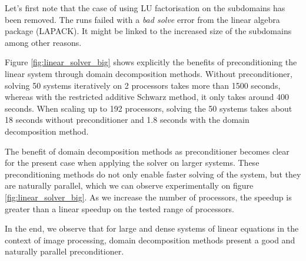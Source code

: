 \ifthesis
 Let's first note that the case of using LU factorisation on the subdomains has been removed.
 The runs failed with a \textit{bad solve} error from the linear algebra package (LAPACK).
 It might be linked to the increased size of the subdomains among other reasons.
\fi

Figure \ref{fig:linear_solver_big} shows explicitly the benefits of preconditioning the linear system through domain decomposition methods.
Without preconditioner, solving 50 systems iteratively on 2 processors takes more than 1500 seconds, whereas with the restricted additive Schwarz method, it only takes around 400 seconds.
When scaling up to 192 processors, solving the 50 systems takes about 18 seconds without preconditioner and 1.8 seconds with the domain decomposition method.

\ifthesis
 The benefit of domain decomposition methods as preconditioner becomes clear for the present case when applying the solver on larger systems.
 These preconditioning methods do not only enable faster solving of the system, but they are naturally parallel, which we can observe experimentally on figure \ref{fig:linear_solver_big}.
 As we increase the number of processors, the speedup is greater than a linear speedup on the tested range of processors.
\fi

In the end, we observe that for large and dense systems of linear equations in the context of image processing, domain decomposition methods present a good and naturally parallel preconditioner.

